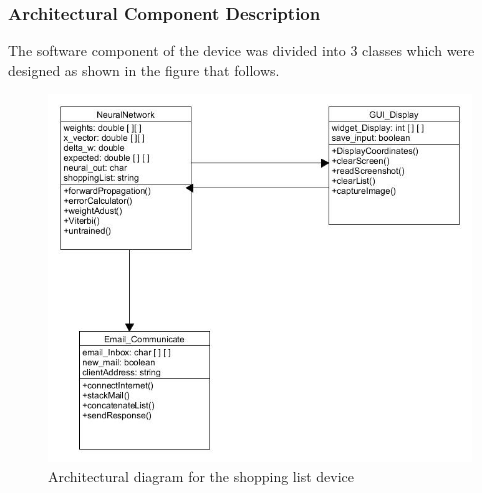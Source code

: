 \subsubsection{Architectural Component Description}
The software component of the device was divided into 3 classes which were designed as shown in the figure that follows.
\begin{figure}[h]
	\centering
	\includegraphics[scale=0.6]{42}
	\caption{Architectural diagram for the shopping list device}
\end{figure}

